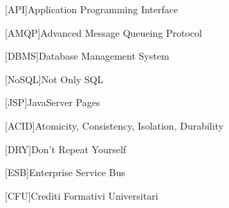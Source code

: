 \begin{acronym}
[API]{Application Programming Interface}%

[AMQP]{Advanced Message Queueing Protocol}%

[DBMS]{Database Management System}%

[NoSQL]{Not Only SQL}%

[JSP]{JavaServer Pages}%

[ACID]{Atomicity, Consistency, Isolation, Durability}%

[DRY]{Don't Repeat Yourself}%

[ESB]{Enterprise Service Bus}%

[CFU]{Crediti Formativi Universitari}%

\end{acronym}